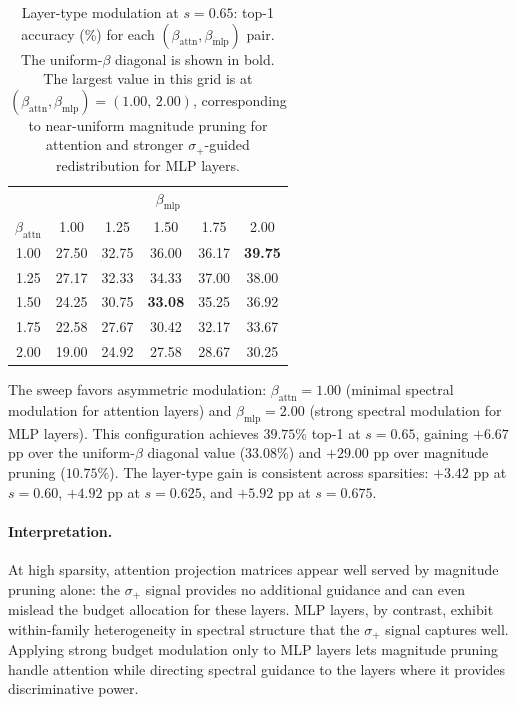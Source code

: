 \documentclass[11pt]{article}
\theoremstyle{plain}
\theoremstyle{definition}
\theoremstyle{remark}
\newcommand{\1}{\mathbf{1}}
\begin{document}
\begin{table}[ht]
\centering
\caption{Layer-type modulation at \(s=0.65\): top-1 accuracy (\%) for each \((\beta_{\mathrm{attn}}, \beta_{\mathrm{mlp}})\) pair.  The uniform-\(\beta\) diagonal is shown in bold.  The largest value in this grid is at \((\beta_{\mathrm{attn}},\beta_{\mathrm{mlp}})=(1.00,\,2.00)\), corresponding to near-uniform magnitude pruning for attention and stronger \(\sigma_+\)-guided redistribution for MLP layers.}
\label{tab:splus_layertype}
\begin{tabular}{c|ccccc}
\toprule
 & \multicolumn{5}{c}{\(\beta_{\mathrm{mlp}}\)} \\
\(\beta_{\mathrm{attn}}\) & 1.00 & 1.25 & 1.50 & 1.75 & 2.00 \\
\midrule
1.00 & 27.50 & 32.75 & 36.00 & 36.17 & \textbf{39.75} \\
1.25 & 27.17 & 32.33 & 34.33 & 37.00 & 38.00 \\
1.50 & 24.25 & 30.75 & \textbf{33.08} & 35.25 & 36.92 \\
1.75 & 22.58 & 27.67 & 30.42 & 32.17 & 33.67 \\
2.00 & 19.00 & 24.92 & 27.58 & 28.67 & 30.25 \\
\bottomrule
\end{tabular}
\end{table}

The sweep favors asymmetric modulation: \(\beta_{\mathrm{attn}}=1.00\) (minimal spectral modulation for attention layers) and \(\beta_{\mathrm{mlp}}=2.00\) (strong spectral modulation for MLP layers).  This configuration achieves \(39.75\%\) top-1 at \(s=0.65\), gaining \(+6.67\) pp over the uniform-\(\beta\) diagonal value (\(33.08\%\)) and \(+29.00\) pp over magnitude pruning (\(10.75\%\)).  The layer-type gain is consistent across sparsities: \(+3.42\) pp at \(s=0.60\), \(+4.92\) pp at \(s=0.625\), and \(+5.92\) pp at \(s=0.675\).

\paragraph{Interpretation.}
At high sparsity, attention projection matrices appear well served by magnitude pruning alone: the \(\sigma_+\) signal provides no additional guidance and can even mislead the budget allocation for these layers.  MLP layers, by contrast, exhibit within-family heterogeneity in spectral structure that the \(\sigma_+\) signal captures well.  Applying strong budget modulation only to MLP layers lets magnitude pruning handle attention while directing spectral guidance to the layers where it provides discriminative power.
\end{document}

